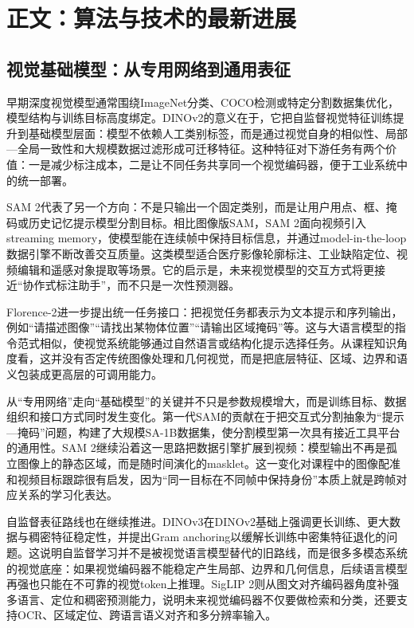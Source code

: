 \documentclass[UTF8,a4paper,12pt]{ctexart}
\newcommand{\model}[1]{\textsf{#1}}
\begin{document}
\section{正文：算法与技术的最新进展}
\subsection{视觉基础模型：从专用网络到通用表征}
早期深度视觉模型通常围绕ImageNet分类、COCO检测或特定分割数据集优化，模型结构与训练目标高度绑定。\model{DINOv2}的意义在于，它把自监督视觉特征训练提升到基础模型层面：模型不依赖人工类别标签，而是通过视觉自身的相似性、局部—全局一致性和大规模数据过滤形成可迁移特征\cite{dinov2}。这种特征对下游任务有两个价值：一是减少标注成本，二是让不同任务共享同一个视觉编码器，便于工业系统中的统一部署。

\model{SAM 2}代表了另一个方向：不是只输出一个固定类别，而是让用户用点、框、掩码或历史记忆提示模型分割目标。相比图像版SAM，\model{SAM 2}面向视频引入streaming memory，使模型能在连续帧中保持目标信息，并通过model-in-the-loop数据引擎不断改善交互质量\cite{sam2}。这类模型适合医疗影像轮廓标注、工业缺陷定位、视频编辑和遥感对象提取等场景。它的启示是，未来视觉模型的交互方式将更接近“协作式标注助手”，而不只是一次性预测器。

\model{Florence-2}进一步提出统一任务接口：把视觉任务都表示为文本提示和序列输出，例如“请描述图像”“请找出某物体位置”“请输出区域掩码”等\cite{florence2}。这与大语言模型的指令范式相似，使视觉系统能够通过自然语言或结构化提示选择任务。从课程知识角度看，这并没有否定传统图像处理和几何视觉，而是把底层特征、区域、边界和语义包装成更高层的可调用能力。

从“专用网络”走向“基础模型”的关键并不只是参数规模增大，而是训练目标、数据组织和接口方式同时发生变化。第一代\model{SAM}的贡献在于把交互式分割抽象为“提示—掩码”问题，构建了大规模SA-1B数据集，使分割模型第一次具有接近工具平台的通用性\cite{sam}。\model{SAM 2}继续沿着这一思路把数据引擎扩展到视频：模型输出不再是孤立图像上的静态区域，而是随时间演化的masklet。这一变化对课程中的图像配准和视频目标跟踪很有启发，因为“同一目标在不同帧中保持身份”本质上就是跨帧对应关系的学习化表达。

自监督表征路线也在继续推进。\model{DINOv3}在\model{DINOv2}基础上强调更长训练、更大数据与稠密特征稳定性，并提出Gram anchoring以缓解长训练中密集特征退化的问题\cite{dinov3}。这说明自监督学习并不是被视觉语言模型替代的旧路线，而是很多多模态系统的视觉底座：如果视觉编码器不能稳定产生局部、边界和几何信息，后续语言模型再强也只能在不可靠的视觉token上推理。\model{SigLIP 2}则从图文对齐编码器角度补强多语言、定位和稠密预测能力\cite{siglip2}，说明未来视觉编码器不仅要做检索和分类，还要支持OCR、区域定位、跨语言语义对齐和多分辨率输入。
\end{document}
